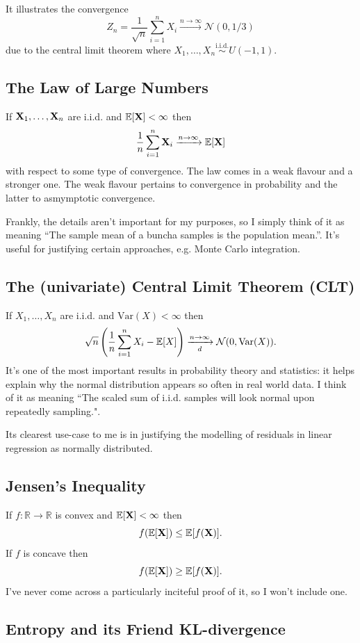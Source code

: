 \documentclass[11pt]{article}
\begin{document}
\begin{appendices}
It illustrates the convergence
$$
Z_n
=
\frac{1}{\sqrt{n}}\sum_{i=1}^n X_i
\xrightarrow{n\to\infty}
\mathcal{N}(0,1/3)
$$
due to the central limit theorem where $X_1,\dots,X_n\overset{\text{i.i.d.}}{\sim}U(-1,1)$.

\subsection{The Law of Large Numbers}
If $\mathbf{X}_1,\dots,\mathbf{X}_n$ are i.i.d. and $\mathbb{E}[\mathbf{X}]<\infty$ then
$$
\frac{1}{n}\sum_{i=1}^n\mathbf{X}_i
\xrightarrow{n\to\infty}
\mathbb{E}[\mathbf{X}]
$$
with respect to some type of convergence. The law comes in a weak flavour and a stronger one. The weak flavour pertains to convergence in probability and the latter to asmymptotic convergence.

Frankly, the details aren't important for my purposes, so I simply think of it as meaning ``The sample mean of a buncha samples is the population mean.''. It's useful for justifying certain approaches, e.g. Monte Carlo integration.

\subsection{The (univariate) Central Limit Theorem (CLT)}
If $X_1,\dots,X_n$ are i.i.d. and $\text{Var}(X)<\infty$ then
$$
\sqrt{n}\left(\frac{1}{n}\sum_{i=1}^nX_i-\mathbb{E}[X]\right)
\xrightarrow[d]{n\to\infty}
\mathcal{N}(0,\text{Var}(X)).
$$
It's one of the most important results in probability theory and statistics: it helps explain why the normal distribution appears so often in real world data. I think of it as meaning ``The scaled sum of i.i.d. samples will look normal upon repeatedly sampling.".

Its clearest use-case to me is in justifying the modelling of residuals in linear regression as normally distributed.

\subsection{Jensen's Inequality}
If $f:\mathbb{R}\to\mathbb{R}$ is convex and $\mathbb{E}[\mathbf{X}]<\infty$ then
$$
f(\mathbb{E}[\mathbf{X}])\leq\mathbb{E}[f(\mathbf{X})].
$$
If $f$ is concave then
$$
f(\mathbb{E}[\mathbf{X}])\geq\mathbb{E}[f(\mathbf{X})].
$$
I've never come across a particularly inciteful proof of it, so I won't include one.

\subsection{Entropy and its Friend KL-divergence}
\label{app:entropy}


\end{appendices}
\end{document}

